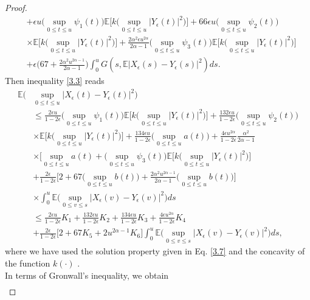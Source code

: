 \documentclass[a4 paper, 12pt]{report}
\theoremstyle{plain}
\begin{document}
\begin{proof}
\begin{align*}
&+\epsilon u\bigg(\sup_{0\leq t\leq u}\psi_1(t)\bigg)\mathbb{E}\bigg[k\bigg(\sup_{0\leq t\leq u}|Y_\epsilon(t)|^2\bigg)\bigg]+66\epsilon u\bigg(\sup_{0\leq t\leq u}\psi_2(t))\\
&\times\mathbb{E}\bigg[k\bigg(\sup_{0\leq t\leq u}|Y_\epsilon(t)|^2\bigg)\bigg]+\frac{2\alpha^2\epsilon u^{2\alpha}}{2\alpha-1}\bigg(\sup_{0\leq t\leq u}\psi_3(t)\bigg)\mathbb{E}\bigg[k\bigg(\sup_{0\leq t\leq u}|Y_\epsilon(t)|^2\bigg)\bigg]\\
&+\epsilon\bigg(67+\frac{2\alpha^2 u^{2\alpha-1}}{2\alpha-1}\bigg)\int_0^uG(s,\mathbb{E}|X_\epsilon(s) - Y_\epsilon(s)|^2)ds.
\end{align*}
Then inequality \eqref{3.3} reads
\begin{align*}
\mathbb{E}\bigg(&\sup_{0\leq t\leq u}|X_\epsilon(t) - Y_\epsilon(t)|^2\bigg)\\
&\leq \frac{2\epsilon u}{1-2\epsilon}\bigg(\sup_{0\leq t\leq u}\psi_1(t)\bigg)\mathbb{E}\bigg[k\bigg(\sup_{0\leq t\leq u}|Y_\epsilon(t)|^2\bigg)\bigg]+\frac{132\epsilon u}{1-2\epsilon}\bigg(\sup_{0\leq t\leq u}\psi_2(t)\bigg)\\
&\times\mathbb{E}\bigg[k\bigg(\sup_{0\leq t\leq u}|Y_\epsilon(t)|^2\bigg)\bigg]+\frac{134\epsilon u}{1-2\epsilon}\bigg(\sup_{0\leq t\leq u}a(t)\bigg)+\frac{4\epsilon u^{2\alpha}}{1-2\epsilon}\frac{\alpha^2}{2\alpha -1}\\
&\times\bigg[\sup_{0\leq t\leq u}a(t)+\bigg(\sup_{0\leq t\leq u}\psi_3(t)\bigg)\mathbb{E}\bigg[k\bigg(\sup_{0\leq t\leq u}|Y_\epsilon(t)|^2\bigg)\bigg]\\
&+\frac{2\epsilon}{1-2\epsilon}\bigg[2+67\bigg(\sup_{0\leq t\leq u}b(t)\bigg)+\frac{2\alpha^2u^{2\alpha-1}}{2\alpha-1}\bigg(\sup_{0\leq t\leq u}b(t)\bigg)\bigg]\\
&\times \int_0^u\mathbb{E}\bigg(\sup_{0\leq v\leq s}|X_\epsilon(v) - Y_\epsilon(v)|^2\bigg)ds\\
&\leq \frac{2\epsilon u}{1-2\epsilon}K_1+\frac{132 \epsilon u}{1-2\epsilon}K_2+\frac{134\epsilon u}{1-2\epsilon}K_3+\frac{4\epsilon u^{2\alpha}}{1-2\epsilon}K_4\\
&+\frac{2\epsilon}{1-2\epsilon}\bigg[2+67K_5+2u^{2\alpha-1}K_6\bigg]\int_0^u\mathbb{E}\bigg(\sup_{0\leq v\leq s}|X_\epsilon(v) - Y_\epsilon(v)|^2\bigg)ds,
\end{align*} 
where we have used the solution property given in Eq. \eqref{3.7} and the concavity of
the function $k(\cdot)$ .\\
In terms of Gronwall's inequality, we obtain 
\begin{align*}

\end{align*}
\end{proof}
\end{document}
